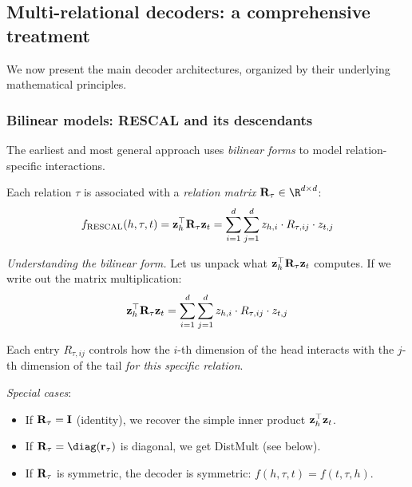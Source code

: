 \begin{notechapter}
\subsection{Multi-relational decoders: a comprehensive treatment}

We now present the main decoder architectures, organized by their underlying mathematical principles.

\subsubsection{Bilinear models: RESCAL and its descendants}

The earliest and most general approach uses \emph{bilinear forms} to model relation-specific interactions.

\begin{definition}
Each relation $\tau$ is associated with a \emph{relation matrix} $\vect{R}_\tau \in \R^{d \times d}$:
\begin{equation}
f_{\text{RESCAL}}(h, \tau, t) = \mathbf{z}_h^\top \mathbf{R}_\tau \mathbf{z}_t = \sum_{i=1}^{d} \sum_{j=1}^{d} z_{h,i} \cdot R_{\tau,ij} \cdot z_{t,j}
\end{equation}
\end{definition}

\begin{intuition}
\emph{Understanding the bilinear form.}
Let us unpack what $\mathbf{z}_h^\top \mathbf{R}_\tau \mathbf{z}_t$ computes. If we write out the matrix multiplication:
\[
\mathbf{z}_h^\top \mathbf{R}_\tau \mathbf{z}_t = \sum_{i=1}^{d} \sum_{j=1}^{d} z_{h,i} \cdot R_{\tau,ij} \cdot z_{t,j}
\]

Each entry $R_{\tau,ij}$ controls how the $i$-th dimension of the head interacts with the $j$-th dimension of the tail \emph{for this specific relation}.

\emph{Special cases}:
\begin{itemize}
    \item If $\mathbf{R}_\tau = \mathbf{I}$ (identity), we recover the simple inner product $\mathbf{z}_h^\top \mathbf{z}_t$.
    \item If $\vect{R}_\tau = \diag(\vect{r}_\tau)$ is diagonal, we get DistMult (see below).
    \item If $\mathbf{R}_\tau$ is symmetric, the decoder is symmetric: $f(h, \tau, t) = f(t, \tau, h)$.
\end{itemize}
\end{intuition}


\end{notechapter}
